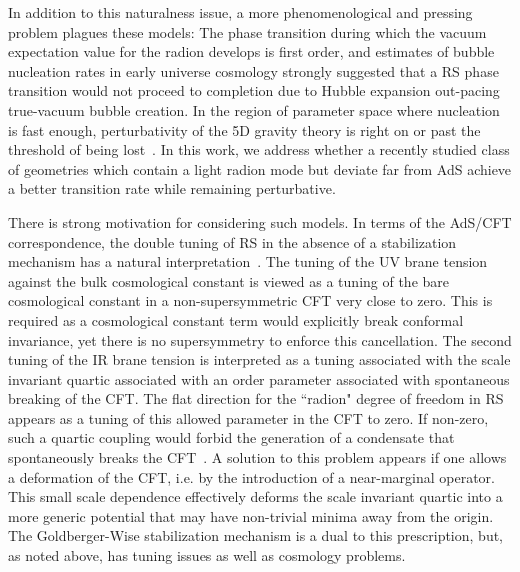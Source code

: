 \documentclass[12pt]{article}
\begin{document}
In addition to this naturalness issue, a more phenomenological and pressing problem plagues these models:  The phase transition during which the vacuum expectation value for the radion develops is first order, and estimates of bubble nucleation rates in early universe cosmology strongly suggested that a RS phase transition would not proceed to completion due to Hubble expansion out-pacing true-vacuum bubble creation.  In the region of parameter space where nucleation is fast enough, perturbativity of the 5D gravity theory is right on or past the threshold of being lost~\cite{Creminelli:2001th,Kaplan:2006yi,Randall:2006py}.  In this work, we  address whether a recently studied class of geometries which contain a light radion mode but deviate far from AdS achieve a better transition rate while remaining perturbative.

There is strong motivation for considering such models. In terms of the AdS/CFT correspondence, the double tuning of RS in the absence of a stabilization mechanism has a natural interpretation~\cite{Gubser:1999vj,Verlinde:1999fy,Rattazzi:2000hs,ArkaniHamed:2000ds,Csaki:1999mp}.  The tuning of the UV brane tension against the bulk cosmological constant is viewed as a tuning of the bare cosmological constant in a non-supersymmetric CFT very close to zero.  This is required as a cosmological constant term would explicitly break conformal invariance, yet there is no supersymmetry to enforce this cancellation.  The second tuning of the IR brane tension is interpreted as a tuning associated with the scale invariant quartic associated with an order parameter associated with spontaneous breaking of the CFT.  The flat direction for the ``radion" degree of freedom in RS appears as a tuning of this allowed parameter in the CFT to zero.  If non-zero, such a quartic coupling would forbid the generation of a condensate that spontaneously breaks the CFT~\cite{Fubini:1976jm}.  A solution to this problem appears if one allows a deformation of the CFT, i.e. by the introduction of a near-marginal operator.   This small scale dependence effectively deforms the scale invariant quartic into a more generic potential that may have non-trivial minima away from the origin.   The Goldberger-Wise stabilization mechanism is a dual to this prescription, but, as noted above, has tuning issues as well as cosmology problems.
\end{document}
